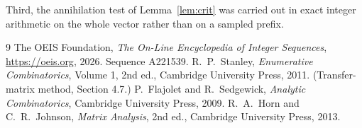 \documentclass[11pt,a4paper]{article}
\theoremstyle{plain}
\theoremstyle{definition}
\begin{document}
Third, the annihilation test of Lemma~\ref{lem:crit} was carried out in exact integer
arithmetic on the whole vector rather than on a sampled prefix.

\begin{thebibliography}{9}
 The OEIS Foundation, \emph{The On-Line Encyclopedia of Integer
Sequences}, \url{https://oeis.org}, 2026. Sequence A221539.
 R.~P.~Stanley, \emph{Enumerative Combinatorics}, Volume 1, 2nd ed.,
Cambridge University Press, 2011. (Transfer-matrix method, Section 4.7.)
 P.~Flajolet and R.~Sedgewick, \emph{Analytic Combinatorics}, Cambridge
University Press, 2009.
 R.~A.~Horn and C.~R.~Johnson, \emph{Matrix Analysis}, 2nd ed., Cambridge
University Press, 2013.
\end{thebibliography}
\end{document}
